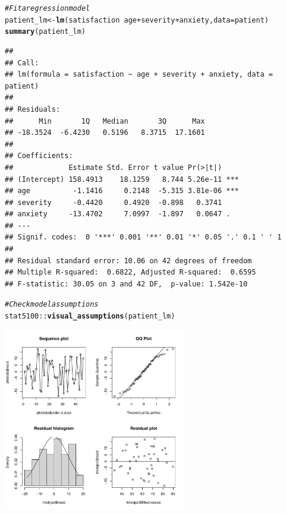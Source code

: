 \documentclass{article}\usepackage[]{graphicx}\usepackage[]{color}
\makeatletter
\newcommand{\hlcom}[1]{\textcolor[rgb]{0.678,0.584,0.686}{\textit{#1}}}%
\newcommand{\hlopt}[1]{\textcolor[rgb]{0,0,0}{#1}}%
\newcommand{\hlstd}[1]{\textcolor[rgb]{0.345,0.345,0.345}{#1}}%
\newcommand{\hlkwb}[1]{\textcolor[rgb]{0.69,0.353,0.396}{#1}}%
\newcommand{\hlkwc}[1]{\textcolor[rgb]{0.333,0.667,0.333}{#1}}%
\newcommand{\hlkwd}[1]{\textcolor[rgb]{0.737,0.353,0.396}{\textbf{#1}}}%
\newenvironment{kframe}{%
 \def\at@end@of@kframe{}%
 \ifinner\ifhmode%
  \def\at@end@of@kframe{\end{minipage}}%
  \begin{minipage}{\columnwidth}%
 \fi\fi%
 \def\FrameCommand##1{\hskip\@totalleftmargin \hskip-\fboxsep
 \colorbox{shadecolor}{##1}\hskip-\fboxsep
     \hskip-\linewidth \hskip-\@totalleftmargin \hskip\columnwidth}%
 \MakeFramed {\advance\hsize-\width
   \@totalleftmargin\z@ \linewidth\hsize
   \@setminipage}}%
 {\par\unskip\endMakeFramed%
 \at@end@of@kframe}
\newenvironment{knitrout}{}{} %
\makeatother
\begin{document}
\begin{knitrout}
\color{fgcolor}\begin{kframe}
\begin{alltt}
\hlcom{# Fit a regression model}
\hlstd{patient_lm} \hlkwb{<-} \hlkwd{lm}\hlstd{(satisfaction} \hlopt{~} \hlstd{age} \hlopt{+} \hlstd{severity} \hlopt{+} \hlstd{anxiety,} \hlkwc{data} \hlstd{= patient)}
\hlkwd{summary}\hlstd{(patient_lm)}
\end{alltt}
\begin{verbatim}
## 
## Call:
## lm(formula = satisfaction ~ age + severity + anxiety, data = patient)
## 
## Residuals:
##      Min       1Q   Median       3Q      Max 
## -18.3524  -6.4230   0.5196   8.3715  17.1601 
## 
## Coefficients:
##             Estimate Std. Error t value Pr(>|t|)    
## (Intercept) 158.4913    18.1259   8.744 5.26e-11 ***
## age          -1.1416     0.2148  -5.315 3.81e-06 ***
## severity     -0.4420     0.4920  -0.898   0.3741    
## anxiety     -13.4702     7.0997  -1.897   0.0647 .  
## ---
## Signif. codes:  0 '***' 0.001 '**' 0.01 '*' 0.05 '.' 0.1 ' ' 1
## 
## Residual standard error: 10.06 on 42 degrees of freedom
## Multiple R-squared:  0.6822,	Adjusted R-squared:  0.6595 
## F-statistic: 30.05 on 3 and 42 DF,  p-value: 1.542e-10
\end{verbatim}
\begin{alltt}
\hlcom{# Check model assumptions}
\hlstd{stat5100}\hlopt{::}\hlkwd{visual_assumptions}\hlstd{(patient_lm)}
\end{alltt}
\end{kframe}

{\centering \includegraphics[width=0.6\textwidth]{figure/unnamed-chunk-2-1} 

}



\end{knitrout}
\end{document}
